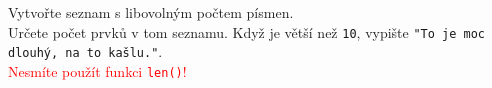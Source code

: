 \question[50]
Vytvořte seznam s libovolným počtem písmen.\\
Určete počet prvků v tom seznamu. Když je větší než \texttt{10}, vypište
\texttt{"To je moc dlouhý, na to kašlu."}.\\
\textcolor{red}{Nesmíte použít funkci \texttt{len()}!}\\